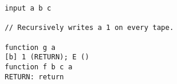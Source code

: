{ \tiny
\begin{lstlisting}
input a b c

// Recursively writes a 1 on every tape.

function g a 
[b] 1 (RETURN); E ()
function f b c a
RETURN: return
\end{lstlisting}
}